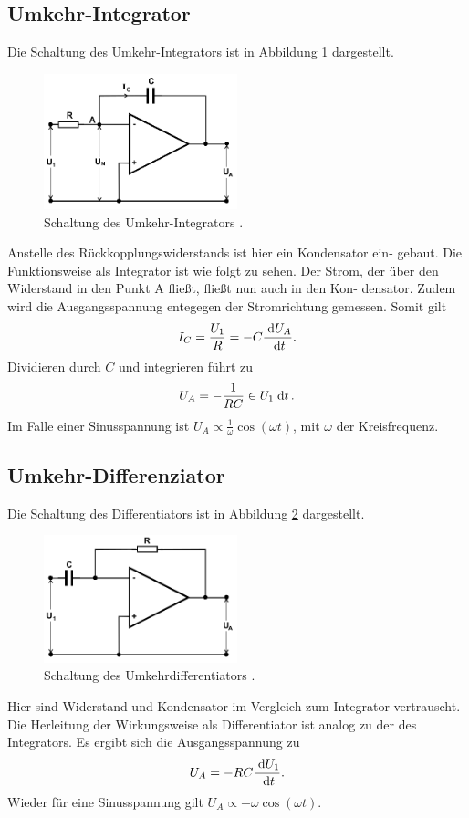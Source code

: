 \subsection{Umkehr-Integrator}
\label{sec:int}
Die Schaltung des Umkehr-Integrators ist in
Abbildung \ref{pic:umInt} dargestellt. 
\begin{figure}[t]
 \includegraphics[width = 0.5\textwidth]{../pics/umkehrInt.png}
 \caption{Schaltung des Umkehr-Integrators \cite{Anl}.}
 \label{pic:umInt}
\end{figure}
Anstelle des Rückkopplungswiderstands ist hier ein Kondensator ein-
gebaut. Die Funktionsweise als Integrator ist
wie folgt zu sehen.
Der Strom, der über den Widerstand in den
Punkt A fließt, fließt nun auch in den Kon-
densator. Zudem wird die Ausgangsspannung
entegegen der Stromrichtung gemessen. Somit
gilt
\begin{align}
 I_C = \frac{U_1}{R} = -C \frac{\; \mathrm{d} U_A}{\; \mathrm{d} t}.
\end{align}
Dividieren durch $C$ und integrieren führt zu
\begin{align}
 U_A = -\frac{1}{RC} \in U_1 \; \mathrm{d} t\,.
\end{align}
Im Falle einer Sinusspannung ist $U_A\propto \frac{1}{\omega} \cos(\omega t)$,
mit $\omega$ der Kreisfrequenz.

\subsection{Umkehr-Differenziator}
\label{sec:diff}
Die Schaltung des Differentiators ist in Abbildung \ref{pic:umDiff}
dargestellt.
\begin{figure}[t]
 \includegraphics[width = 0.5\textwidth]{../pics/umkehrDiff.png}
 \caption{Schaltung des Umkehrdifferentiators \cite{Anl}.}
 \label{pic:umDiff}
\end{figure}
Hier sind Widerstand 
und Kondensator im Vergleich zum
Integrator vertrauscht. Die Herleitung der Wirkungsweise 
als Differentiator ist analog zu der
des Integrators. Es ergibt sich die Ausgangsspannung zu
\begin{align}
 U_A = -RC \frac{\; \mathrm{d} U_1}{\; \mathrm{d} t}.
\end{align}
Wieder für eine Sinusspannung gilt $U_A\propto -\omega \cos(\omega t)$.

